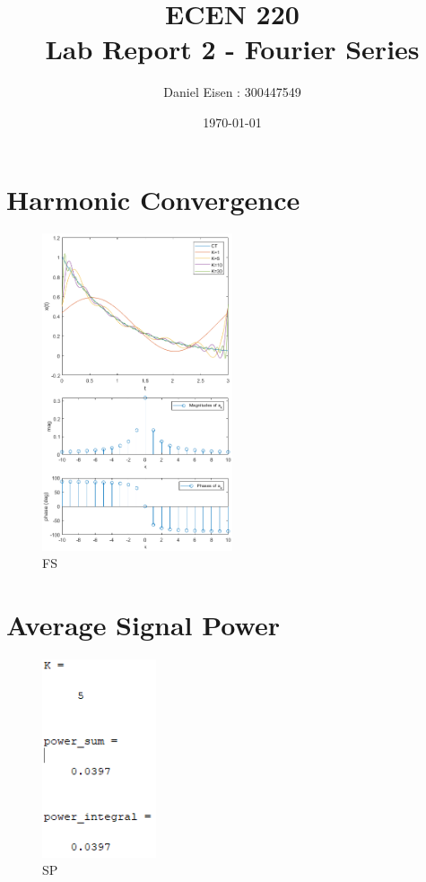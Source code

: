 \documentclass[9pt,twocolumn]{article}
\title{ECEN 220 \\ Lab Report 2 - Fourier Series}
\author{Daniel Eisen : 300447549}
\date{\today}
\begin{document}
\maketitle

\section{Harmonic Convergence}

\begin{figure}[h]
\includegraphics[width=0.5\textwidth]{1}
\caption{FS}
\end{figure}

\clearpage
\section{Average Signal Power}

\newpage
\begin{figure}[h]
\includegraphics[width=0.3\textwidth]{2}
\caption{SP}
\end{figure}
\end{document}
